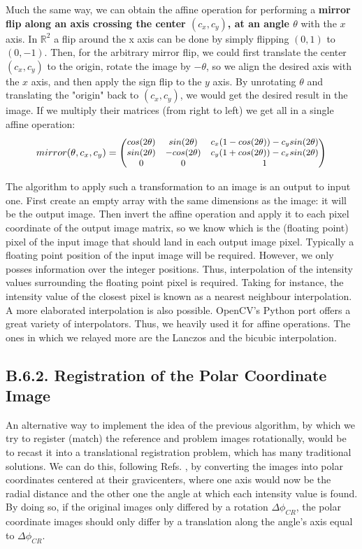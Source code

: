 \documentclass[11pt, a4paper, twoside]{article} %
\newcommand{\R}{\mathbb{R}} %
\DeclareRobustCommand{\mybox}[2][gray!10]{%
\begin{tcolorbox}[   %
        left=0.2cm,
        right=0.2cm,
        top=0.15cm,
        bottom=0.15cm,
        colback=#1,
        colframe=#1,
        width=\dimexpr\textwidth\relax, 
        enlarge left by=0mm,
        boxsep=5pt,
        arc=0pt,outer arc=0pt,
        ]
        #2
\end{tcolorbox}
}
\begin{document}
\mybox{
Much the same way, we can obtain the affine operation for performing a {\bf mirror flip along an axis crossing the center $(c_x,c_y)$, at an angle $\theta$} with the $x$ axis. In $\R^2$ a flip around the x axis can be done by simply flipping $(0,1)$ to $(0,-1)$. Then, for the arbitrary mirror flip, we could first translate the center $(c_x,c_y)$ to the origin, rotate the image by $-\theta$, so we align the desired axis with the $x$ axis, and then apply the sign flip to the $y$ axis. By unrotating $\theta$ and translating the "origin" back to $(c_x,c_y)$, we would get the desired result in the image. If we multiply their matrices (from right to left) we get all in a single affine operation:
\begin{equation}\label{mirror}\small
mirror(\theta,c_x,c_y)=\begin{pmatrix}
cos(2\theta) & sin(2\theta) & c_x(1-cos(2\theta))-c_ysin(2\theta) \\
sin(2\theta) & -cos(2\theta) & c_y(1+cos(2\theta))-c_xsin(2\theta)\\
0 & 0& 1
\end{pmatrix}
\end{equation}

The algorithm to apply such a transformation to an image is an output to input one. First create an empty array with the same dimensions as the image: it will be the output image. Then invert the affine operation and apply it to each pixel coordinate of the output image matrix, so we know which is the (floating point) pixel of the input image that should land in each output image pixel. Typically a floating point position of the input image will be required. However, we only posses information over the integer positions. Thus, interpolation of the intensity values surrounding the floating point pixel is required. Taking for instance, the intensity value of the closest pixel is known as a nearest neighbour interpolation. A more elaborated interpolation is also possible. OpenCV's Python port \cite{cv2} offers a great variety of interpolators. Thus, we heavily used it for affine operations. The ones in which we relayed more are the Lanczos \cite{Lanczos} and the bicubic interpolation.

}

\subsection*{B.6.2. Registration of the Polar Coordinate Image \vspace{-0.15cm}}
An alternative way to implement the idea of the previous algorithm, by which we try to register (match) the reference and problem images rotationally, would be to recast it into a translational registration problem, which has many traditional solutions. We can do this, following Refs. \cite{phase,phase2}, by converting the images into polar coordinates centered at their gravicenters, where one axis would now be the radial distance and the other one the angle at which each intensity value is found. By doing so, if the original images only differed by a rotation $\Delta\phi_{CR}$, the polar coordinate images should only differ by a translation along the angle's axis equal to $\Delta\phi_{CR}$.
\end{document}

